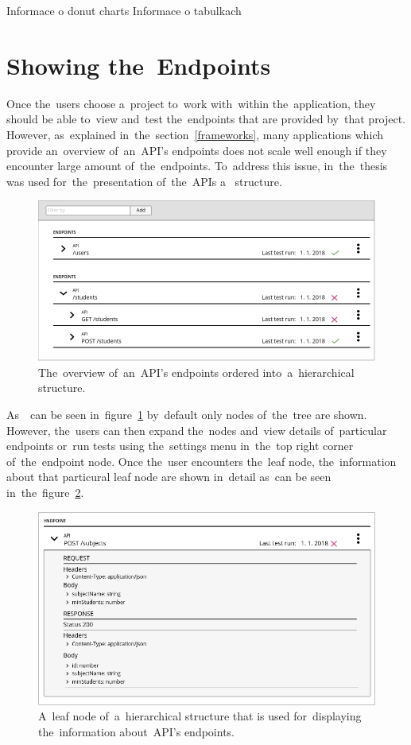 Informace o donut charts
Informace o tabulkach

\section{Showing the~Endpoints}
Once the~users choose a~project to~work with~within the~application, they should
be able to~view and~test the~endpoints that are provided by~that project.
However, as~explained in~the~section~\ref{frameworks}, many applications which
provide an~overview of~an~API's endpoints does not scale well enough if they
encounter large amount of~the~endpoints. To~address this issue, in~the~thesis
was used for~the~presentation of~the~APIs a~ structure.

\begin{figure}[!hbt]
	\centering
	\includegraphics[scale=0.4]{./designs/drafts-1.0/api-general.png}
	\caption{The~overview of~an~API's endpoints ordered into~a~hierarchical
	 structure.}
	\label{api-general}
\end{figure}

As~~can be seen in~figure~\ref{api-general} by~default only  nodes
of~the~tree are shown. However, the~users can then expand the~nodes and~view
details of~particular endpoints or~run tests using the~settings menu in~the~top
right corner of~the~endpoint node. Once the~user encounters the~leaf node,
the~information about that particural leaf node are shown in~detail as~can be
seen in~the~figure~\ref{api-detail}.

\begin{figure}[!hbt]
	\centering
	\includegraphics[scale=0.4]{./designs/drafts-1.0/api-detail.png}
	\caption{A~leaf node of~a~hierarchical structure that is used for~displaying
	the~information about~API's endpoints.}
	\label{api-detail}
\end{figure}


